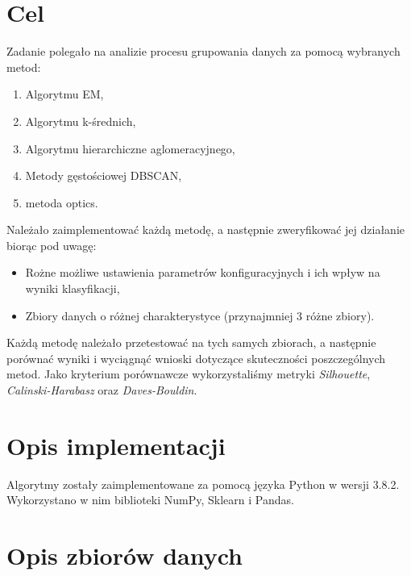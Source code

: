 \documentclass[a4paper,11pt]{article}
\begin{document}
\setcounter{page}{2}
\tableofcontents
\newpage
{}


\section{Cel} \label{sec:cel}
Zadanie polegało na analizie procesu grupowania danych za pomocą wybranych metod:

\begin{enumerate}
    \item Algorytmu EM,
    \item Algorytmu k-średnich,
    \item Algorytmu hierarchiczne aglomeracyjnego,
    \item Metody gęstościowej DBSCAN,
    \item metoda optics.
\end{enumerate}

Należało zaimplementować każdą metodę, a następnie zweryfikować jej działanie biorąc pod uwagę:

\begin{itemize}
    \item Rożne możliwe ustawienia parametrów konfiguracyjnych i ich wpływ na wyniki klasyfikacji,
    \item Zbiory danych o różnej charakterystyce (przynajmniej 3 różne zbiory).
\end{itemize}

Każdą metodę należało przetestować na tych samych zbiorach, a następnie porównać wyniki i wyciągnąć wnioski dotyczące skuteczności poszczególnych metod. Jako kryterium porównawcze wykorzystaliśmy metryki \textit{Silhouette}, \textit{Calinski-Harabasz} oraz \textit{Daves-Bouldin}.


\section{Opis implementacji}

Algorytmy zostały zaimplementowane za pomocą języka Python w wersji 3.8.2.
Wykorzystano w nim biblioteki NumPy, Sklearn i Pandas. 


\section{Opis zbiorów danych} \label{sec:dataset}
\end{document}
